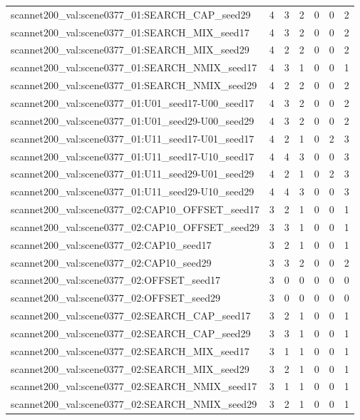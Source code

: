 \begin{table}[t]
\begin{tabular}{lrrrrrr}
scannet200\_val:scene0377\_01:SEARCH\_CAP\_seed29 & 4 & 3 & 2 & 0 & 0 & 2 \\
scannet200\_val:scene0377\_01:SEARCH\_MIX\_seed17 & 4 & 3 & 2 & 0 & 0 & 2 \\
scannet200\_val:scene0377\_01:SEARCH\_MIX\_seed29 & 4 & 2 & 2 & 0 & 0 & 2 \\
scannet200\_val:scene0377\_01:SEARCH\_NMIX\_seed17 & 4 & 3 & 1 & 0 & 0 & 1 \\
scannet200\_val:scene0377\_01:SEARCH\_NMIX\_seed29 & 4 & 2 & 2 & 0 & 0 & 2 \\
scannet200\_val:scene0377\_01:U01\_seed17-U00\_seed17 & 4 & 3 & 2 & 0 & 0 & 2 \\
scannet200\_val:scene0377\_01:U01\_seed29-U00\_seed29 & 4 & 3 & 2 & 0 & 0 & 2 \\
scannet200\_val:scene0377\_01:U11\_seed17-U01\_seed17 & 4 & 2 & 1 & 0 & 2 & 3 \\
scannet200\_val:scene0377\_01:U11\_seed17-U10\_seed17 & 4 & 4 & 3 & 0 & 0 & 3 \\
scannet200\_val:scene0377\_01:U11\_seed29-U01\_seed29 & 4 & 2 & 1 & 0 & 2 & 3 \\
scannet200\_val:scene0377\_01:U11\_seed29-U10\_seed29 & 4 & 4 & 3 & 0 & 0 & 3 \\
scannet200\_val:scene0377\_02:CAP10\_OFFSET\_seed17 & 3 & 2 & 1 & 0 & 0 & 1 \\
scannet200\_val:scene0377\_02:CAP10\_OFFSET\_seed29 & 3 & 3 & 1 & 0 & 0 & 1 \\
scannet200\_val:scene0377\_02:CAP10\_seed17 & 3 & 2 & 1 & 0 & 0 & 1 \\
scannet200\_val:scene0377\_02:CAP10\_seed29 & 3 & 3 & 2 & 0 & 0 & 2 \\
scannet200\_val:scene0377\_02:OFFSET\_seed17 & 3 & 0 & 0 & 0 & 0 & 0 \\
scannet200\_val:scene0377\_02:OFFSET\_seed29 & 3 & 0 & 0 & 0 & 0 & 0 \\
scannet200\_val:scene0377\_02:SEARCH\_CAP\_seed17 & 3 & 2 & 1 & 0 & 0 & 1 \\
scannet200\_val:scene0377\_02:SEARCH\_CAP\_seed29 & 3 & 3 & 1 & 0 & 0 & 1 \\
scannet200\_val:scene0377\_02:SEARCH\_MIX\_seed17 & 3 & 1 & 1 & 0 & 0 & 1 \\
scannet200\_val:scene0377\_02:SEARCH\_MIX\_seed29 & 3 & 2 & 1 & 0 & 0 & 1 \\
scannet200\_val:scene0377\_02:SEARCH\_NMIX\_seed17 & 3 & 1 & 1 & 0 & 0 & 1 \\
scannet200\_val:scene0377\_02:SEARCH\_NMIX\_seed29 & 3 & 2 & 1 & 0 & 0 & 1 \\

\end{tabular}
\end{table}

